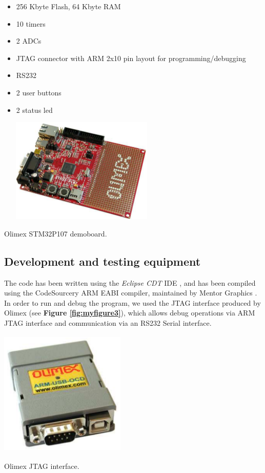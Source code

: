 \documentclass[a4paper,10pt]{article}
\makeatletter
\newenvironment{figurehere}{\def\@captype{figure}\vspace{2ex}}{\vspace{2ex}}
\makeatother
\begin{document}
\begin{multicols}{2}
\begin{itemize}
\item 256 Kbyte Flash, 64 Kbyte RAM
\item 10 timers
\item 2 ADCs
\item JTAG connector with ARM 2x10 pin layout for programming/debugging
\item RS232
\item 2 user buttons
\item 2 status led 
\end{itemize}

\begin{figurehere}
 \centering
 \includegraphics[width=8cm, height=5cm]{./eps/STM32P107}
 \caption{Olimex STM32P107 demoboard.}
 \label{fig:myfigure2}
\end{figurehere}

\subsection{Development and testing equipment}

The code has been written using the \textit{Eclipse CDT} IDE \cite{cdt}, and has been compiled using the CodeSourcery ARM EABI compiler, maintained by Mentor Graphics \cite{sourcery}.\newline
In order to run and debug the program, we used the JTAG interface produced by Olimex (see {\bf Figure \ref{fig:myfigure3}}), which allows debug operations via ARM JTAG interface and communication via an RS232 Serial interface.

\begin{figurehere}
 \centering
 \includegraphics[width=6cm, height=6cm]{./eps/arm-usb-ocd}
 \caption{Olimex JTAG interface.}
 \label{fig:myfigure3}
\end{figurehere}


\end{multicols}
\end{document}
